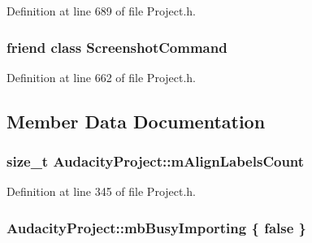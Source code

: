 Definition at line 689 of file Project.\+h.

\subsubsection[{\texorpdfstring{Screenshot\+Command}{ScreenshotCommand}}]{\setlength{\rightskip}{0pt plus 5cm}friend class {\bf Screenshot\+Command}\hspace{0.3cm}{\ttfamily [friend]}}\hypertarget{class_audacity_project_a760b79a183ea3e3e0a058eb7c0fa3564}{}\label{class_audacity_project_a760b79a183ea3e3e0a058eb7c0fa3564}


Definition at line 662 of file Project.\+h.



\subsection{Member Data Documentation}
\subsubsection[{\texorpdfstring{m\+Align\+Labels\+Count}{mAlignLabelsCount}}]{\setlength{\rightskip}{0pt plus 5cm}size\+\_\+t Audacity\+Project\+::m\+Align\+Labels\+Count}\hypertarget{class_audacity_project_a2449643b5d7ede08b8d3919559aa72f1}{}\label{class_audacity_project_a2449643b5d7ede08b8d3919559aa72f1}


Definition at line 345 of file Project.\+h.

\subsubsection[{\texorpdfstring{mb\+Busy\+Importing}{mbBusyImporting}}]{ Audacity\+Project\+::mb\+Busy\+Importing \{ {\bf false} \}}\hypertarget{class_audacity_project_af569662fde524439adf8ee98301f7e60}{}\label{class_audacity_project_af569662fde524439adf8ee98301f7e60}


